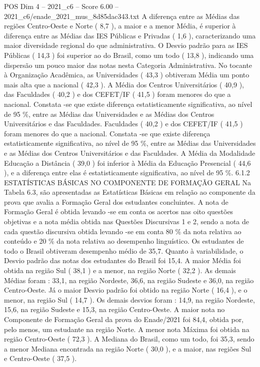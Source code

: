 \begin{textsample}{POS Dim 4 – 2021\_c6 – Score 6.00 – 2021\_c6/enade\_2021\_mus\_8d85dac343.txt}
A diferença entre as Médias das regiões Centro-Oeste e Norte ( 8,7 ), a maior e a menor Média, é superior à diferença entre as Médias das IES Públicas e Privadas ( 1,6 ), caracterizando uma maior diversidade regional do que administrativa.
O Desvio padrão para as IES Públicas ( 14,3 ) foi superior ao do Brasil, como um todo ( 13,8 ), indicando uma dispersão um pouco maior das notas nesta Categoria Administrativa.
No tocante à Organização Acadêmica, as Universidades ( 43,3 ) obtiveram Média um ponto mais alta que a nacional ( 42,3 ).
A Média dos Centros Universitários ( 40,9 ), das Faculdades ( 40,2 ) e dos CEFET/IF ( 41,5 ) foram menores do que a nacional.
Constata -se que existe diferença estatisticamente significativa, ao nível de 95 \%, entre as Médias das Universidades e as Médias dos Centros Universitários e das Faculdades.
Faculdades ( 40,2 ) e dos CEFET/IF ( 41,5 ) foram menores do que a nacional.
Constata -se que existe diferença estatisticamente significativa, ao nível de 95 \%, entre as Médias das Universidades e as Médias dos Centros Universitários e das Faculdades.
A Média da Modalidade Educação a Distância ( 39,0 ) foi inferior à Média da Educação Presencial ( 44,6 ), e a diferença entre elas é estatisticamente significativa, ao nível de 95 \%. 6.1.2 ESTATÍSTICAS BÁSICAS NO COMPONENTE DE FORMAÇÃO GERAL Na Tabela 6.3, são apresentadas as Estatísticas Básicas em relação ao componente da prova que avalia a Formação Geral dos estudantes concluintes.
A nota de Formação Geral é obtida levando -se em conta os acertos nas oito questões objetivas e a nota média obtida nas Questões Discursivas 1 e 2, sendo a nota de cada questão discursiva obtida levando -se em conta 80 \% da nota relativa ao conteúdo e 20 \% da nota relativa ao desempenho linguístico.
Os estudantes de todo o Brasil obtiveram desempenho médio de 35,7.
Quanto à variabilidade, o Desvio padrão das notas dos estudantes do Brasil foi 15,4.
A maior Média foi obtida na região Sul ( 38,1 ) e a menor, na região Norte ( 32,2 ).
As demais Médias foram : 33,1, na região Nordeste, 36,6, na região Sudeste e 36,0, na região Centro-Oeste.
Já o maior Desvio padrão foi obtido na região Norte ( 16,4 ), e o menor, na região Sul ( 14,7 ).
Os demais desvios foram : 14,9, na região Nordeste, 15,6, na região Sudeste e 15,3, na região Centro-Oeste.
A maior nota no Componente de Formação Geral da prova do Enade/2021 foi 84,4, obtida por, pelo menos, um estudante na região Norte.
A menor nota Máxima foi obtida na região Centro-Oeste ( 72,3 ).
A Mediana do Brasil, como um todo, foi 35,3, sendo a menor Mediana encontrada na região Norte ( 30,0 ), e a maior, nas regiões Sul e Centro-Oeste ( 37,5 ).

\end{textsample}
